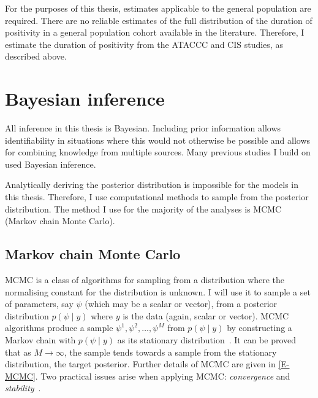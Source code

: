 \documentclass[thesis.tex]{subfiles}
\begin{document}
For the purposes of this thesis, estimates applicable to the general population are required.
There are no reliable estimates of the full distribution of the duration of positivity in a general population cohort available in the literature.
Therefore, I estimate the duration of positivity from the ATACCC and CIS studies, as described above.

\section{Bayesian inference} \label{intro:sec:Bayes}

All inference in this thesis is Bayesian.
Including prior information allows identifiability in situations where this would not otherwise be possible and allows for combining knowledge from multiple sources.
Many previous studies I build on used Bayesian inference.

Analytically deriving the posterior distribution is impossible for the models in this thesis.
Therefore, I use computational methods to sample from the posterior distribution.
The method I use for the majority of the analyses is MCMC (Markov chain Monte Carlo).

\subsection{Markov chain Monte Carlo} \label{intro:sec:MCMC}

MCMC is a class of algorithms for sampling from a distribution where the normalising constant for the distribution is unknown.
I will use it to sample a set of parameters, say $\psi$ (which may be a scalar or vector), from a posterior distribution $p(\psi \mid y)$ where $y$ is the data (again, scalar or vector).
MCMC algorithms produce a sample $\psi^1, \psi^2, \dots, \psi^M$ from $p(\psi \mid y)$ by constructing a Markov chain with $p(\psi \mid y)$ as its stationary distribution~\autocite[275]{gelmanBDA}.
It can be proved that as $M\to\infty$, the sample tends towards a sample from the stationary distribution, \ie the target posterior.
Further details of MCMC are given in \cref{E-MCMC}.
Two practical issues arise when applying MCMC: \emph{convergence} and \emph{stability}~\autocite[72]{lunnBUGS}.
\end{document}
